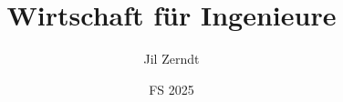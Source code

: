 \documentclass[a4paper, fontsize = 8pt, landscape]{scrartcl}
\title{Wirtschaft für Ingenieure}
\author{Jil Zerndt}
\date{FS 2025}
\begin{document}
\begin{multicols}{2}
	\thispagestyle{TitlePageStyle}
	\maketitle
	\sffamily
	
	\raggedcolumns
    
    \raggedcolumns
    
    \raggedcolumns
    \pagebreak
    \end{multicols}

\begin{multicols}{3}
    \sffamily
    
    \raggedcolumns
    
    \raggedcolumns
    
    \raggedcolumns
    
    \raggedcolumns
    
    \raggedcolumns
    
    \raggedcolumns
    
    \raggedcolumns
\end{multicols}
\end{document}
